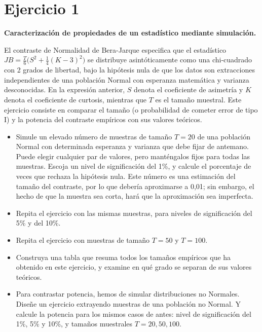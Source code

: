 \documentclass[12pt]{article}
\begin{document}
\setcounter{footnote}{0} %
\renewcommand*{\thefootnote}{\arabic{footnote}} %


\section{Ejercicio 1}

\textbf{Caracterización de propiedades de un estadístico mediante simulación.}

El contraste de Normalidad de Bera-Jarque especifica que el estadístico $JB = \frac{T}{6}\big(S^2 + \frac{1}{4}(K-3)^2\big)$ se distribuye asintóticamente como una chi-cuadrado con 2 grados de libertad, bajo la hipótesis nula de que los datos son extracciones independientes de una población Normal con esperanza matemática y varianza desconocidas. En la expresión anterior, $S$ denota el coeficiente de asimetría y $K$ denota el coeficiente de curtosis, mientras que $T$ es el tamaño muestral. Este ejercicio consiste en comparar el tamaño (o probabilidad de cometer error de tipo I) y la potencia del contraste empíricos con sus valores teóricos. 

\begin{itemize}
    \item Simule un elevado número de muestras de tamaño $T = 20$ de una población Normal con determinada esperanza y varianza que debe fijar de antemano. Puede elegir cualquier par de valores, pero manténgalos fijos para todas las muestras. Escoja un nivel de significación del 1\%, y calcule el porcentaje de veces que rechaza la hipótesis nula. Este número es una estimación del tamaño del contraste, por lo que debería aproximarse a 0,01; sin embargo, el hecho de que la muestra sea corta, hará que la aproximación sea imperfecta. 
    
    \item Repita el ejercicio con las mismas muestras, para niveles de significación del 5\% y del 10\%.
    
    \item Repita el ejercicio con muestras de tamaño $T = 50$ y $T = 100$.
    
    \item Construya una tabla que resuma todos los tamaños empíricos que ha obtenido en este ejercicio, y examine en qué grado se separan de sus valores teóricos.
    
    \item Para contrastar potencia, hemos de simular distribuciones no Normales. Diseñe un ejercicio extrayendo muestras de una población no Normal. Y calcule la potencia para los mismos casos de antes: nivel de significación del 1\%, 5\% y 10\%, y tamaños muestrales $T = 20, 50, 100$.
\end{itemize}
\end{document}
